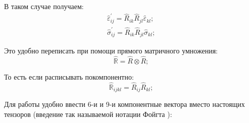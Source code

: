 \documentclass[../main.tex]{subfiles}
\newcommand{\vep}{\varepsilon}
\begin{document}
    В таком случае получаем:
    \begin{equation}
        \label{transform_sigma_vep}
        \begin{aligned}
            \hat{\vep}^{'}_{ij} = \hat{R}_{ik} \hat{R}_{jl} \hat{\vep}_{kl};\\
            \hat{\sigma}^{'}_{ij} = \hat{R}_{ik} \hat{R}_{jl} \hat{\sigma}_{kl};  
        \end{aligned}
    \end{equation}

    Это удобно переписать при помощи прямого матричного умножения:
    \begin{equation*}
        \hat{\mathbb{R}} = \hat R \otimes \hat R;
    \end{equation*}

    То есть если расписывать покомпонентно: 
    \begin{equation*}
        \hat{\mathbb{R}}_{ijkl} = \hat{R}_{ij} \hat{R}_{kl};
    \end{equation*}

    Для работы удобно ввести 6-и и 9-и компонентные вектора вместо настоящих тензоров
    (введение так называемой нотации Фойгта \cite{Aquis:Tensor:2011}):
\end{document}
